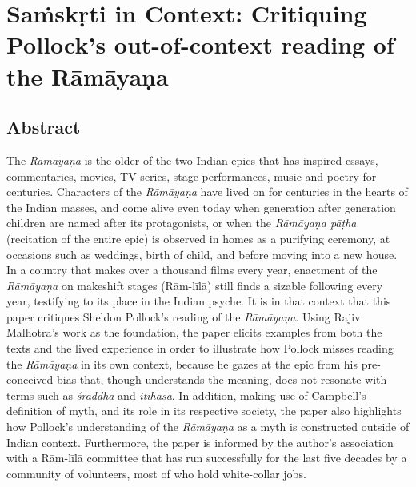 
\chapter{Saṁskṛti in Context: Critiquing Pollock’s out-of-context reading of the Rāmāyaṇa}\label{chapter7}



\section*{Abstract}

The \textit{Rāmāyaṇa} is the older of the two Indian epics that has inspired essays, commentaries, movies, TV series, stage performances, music and poetry for centuries. Characters of the \textit{Rāmāyaṇa} have lived on for centuries in the hearts of the Indian masses, and come alive even today when generation after generation children are named after its protagonists, or when the \textit{Rāmāyaṇa pāṭha} (recitation of the entire epic) is observed in homes as a purifying ceremony, at occasions such as weddings, birth of child, and before moving into a new house. In a country that makes over a thousand films every year, enactment of the \textit{Rāmāyaṇa} on makeshift stages (Rām-līlā) still finds a sizable following every year, testifying to its place in the Indian psyche. It is in that context that this paper critiques Sheldon Pollock’s reading of the \textit{Rāmāyaṇa}. Using Rajiv Malhotra’s work as the foundation, the paper elicits examples from both the texts and the lived experience in order to illustrate how Pollock misses reading the \textit{Rāmāyaṇa} in its own context, because he gazes at the epic from his pre-conceived bias that, though understands the meaning, does not resonate with terms such as \textit{śraddhā} and \textit{itihāsa}. In addition, making use of Campbell’s definition of myth, and its role in its respective society, the paper also highlights how Pollock’s understanding of the \textit{Rāmāyaṇa} as a myth is constructed outside of Indian context. Furthermore, the paper is informed by the author’s association with a Rām-līlā committee that has run successfully for the last five decades by a community of volunteers, most of who hold white-collar jobs.

